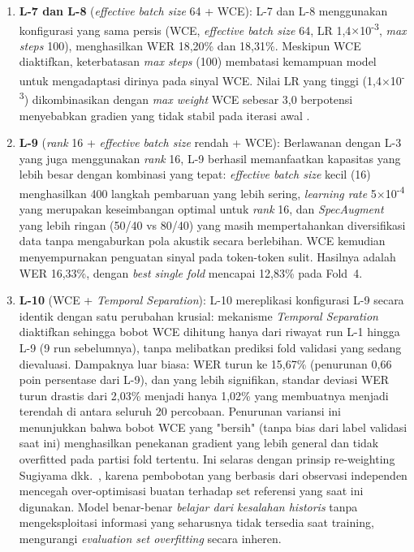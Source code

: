 \begin{enumerate}
    \item \textbf{L-7 dan L-8} (\textit{effective batch size} 64 + WCE): L-7 dan L-8 menggunakan konfigurasi yang sama persis (WCE, \textit{effective batch size} 64, LR 1,4$\times$10\textsuperscript{-3}, \textit{max steps} 100), menghasilkan WER 18,20\% dan 18,31\%. Meskipun WCE diaktifkan, keterbatasan \textit{max steps} (100) membatasi kemampuan model untuk mengadaptasi dirinya pada sinyal WCE. Nilai LR yang tinggi (1,4$\times$10\textsuperscript{-3}) dikombinasikan dengan \textit{max weight} WCE sebesar 3,0 berpotensi menyebabkan gradien yang tidak stabil pada iterasi awal \cite{pascanu2013difficulty}.

    \item \textbf{L-9} (\textit{rank} 16 + \textit{effective batch size} rendah + WCE): Berlawanan dengan L-3 yang juga menggunakan \textit{rank} 16, L-9 berhasil memanfaatkan kapasitas yang lebih besar dengan kombinasi yang tepat: \textit{effective batch size} kecil (16) menghasilkan 400 langkah pembaruan yang lebih sering, \textit{learning rate} 5$\times$10\textsuperscript{-4} yang merupakan keseimbangan optimal untuk \textit{rank} 16, dan \textit{SpecAugment} yang lebih ringan (50/40 vs 80/40) yang masih mempertahankan diversifikasi data tanpa mengaburkan pola akustik secara berlebihan. WCE kemudian menyempurnakan penguatan sinyal pada token-token sulit. Hasilnya adalah WER 16,33\%, dengan \textit{best single fold} mencapai 12,83\% pada Fold~4.

    \item \textbf{L-10} (WCE + \textit{Temporal Separation}): L-10 mereplikasi konfigurasi L-9 secara identik dengan satu perubahan krusial: mekanisme \textit{Temporal Separation} diaktifkan sehingga bobot WCE dihitung hanya dari riwayat run L-1 hingga L-9 (9 run sebelumnya), tanpa melibatkan prediksi fold validasi yang sedang dievaluasi. Dampaknya luar biasa: WER turun ke 15,67\% (penurunan 0,66 poin persentase dari L-9), dan yang lebih signifikan, standar deviasi WER turun drastis dari 2,03\% menjadi hanya 1,02\% yang membuatnya menjadi terendah di antara seluruh 20 percobaan. Penurunan variansi ini menunjukkan bahwa bobot WCE yang "bersih" (tanpa bias dari label validasi saat ini) menghasilkan penekanan gradient yang lebih general dan tidak overfitted pada partisi fold tertentu. Ini selaras dengan prinsip re-weighting Sugiyama dkk.\ \cite{sugiyama2007covariate}, karena pembobotan yang berbasis dari observasi independen mencegah over-optimisasi buatan terhadap set referensi yang saat ini digunakan. Model benar-benar \textit{belajar dari kesalahan historis} tanpa mengeksploitasi informasi yang seharusnya tidak tersedia saat training, mengurangi \textit{evaluation set overfitting} secara inheren.
\end{enumerate}


